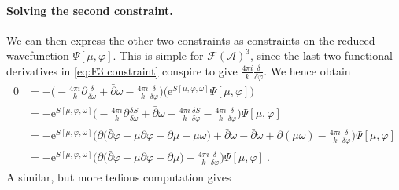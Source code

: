 \documentclass[12pt,a4paper]{article}
\begin{document}
\paragraph{Solving the second constraint.} We can then express the other two constraints as constraints on the reduced wavefunction $\Psi[\mu,\varphi]$. This is simple for $\mathcal{F}(\mathcal{A})^3$, since the last two functional derivatives in \eqref{eq:F3 constraint} conspire to give $\frac{4\pi i}{k} \frac{\delta}{\delta \varphi}$. We hence obtain 
\begin{align} \nonumber
0&=-\bigg(-\frac{4\pi i}{k} \partial \frac{\delta}{\delta \omega}+\bar{\partial} \omega-\frac{4\pi i}{k} \frac{\delta}{\delta \varphi}\bigg) \big(\mathrm{e}^{S[\mu,\varphi,\omega]} \Psi[\mu,\varphi]\big)  \nonumber \\
&= -\mathrm{e}^{S[\mu,\varphi,\omega]} \bigg( -\frac{4\pi i}{k} \partial \frac{\delta S}{\delta \omega}+\bar{\partial} \omega-\frac{4\pi i}{k} \frac{\delta S}{\delta \varphi}-\frac{4\pi i}{k} \frac{\delta}{\delta \varphi} \bigg) \Psi[\mu,\varphi]  \nonumber \\
&=-\mathrm{e}^{S[\mu,\varphi,\omega]} \bigg(\partial \big( \bar{\partial} \varphi-\mu \partial \varphi-\partial \mu-\mu \omega \big)+\bar{\partial} \omega
-\bar{\partial} \omega+\partial(\mu \omega)-\frac{4\pi i}{k} \frac{\delta}{\delta \varphi} \bigg) \Psi[\mu,\varphi] \nonumber \\
&=-\mathrm{e}^{S[\mu,\varphi,\omega]} \bigg(\partial \big( \bar{\partial} \varphi-\mu \partial \varphi-\partial \mu\big)-\frac{4\pi i}{k} \frac{\delta}{\delta \varphi} \bigg) \Psi[\mu,\varphi] ~. \label{eq:F3 constraint after first reduction}
\end{align}
A similar, but more tedious computation gives 
\end{document}
